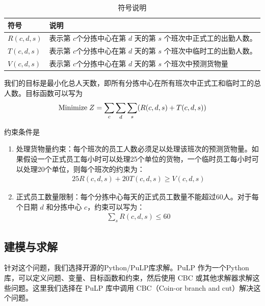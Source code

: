 \documentclass[UTF8]{article}%
\begin{document}
\begin{table}[!ht]
\renewcommand\arraystretch{1.2}
\caption{符号说明}%
\centering%
\begin{tabular}{p{3cm}<{\centering}p{11cm}<{\centering}}%
\toprule%
符号&说明 \\
\midrule%
$R(c,d,s)$&表示第 \(c\)个分拣中心在第 
$d$ 天的第 
$s$ 个班次中正式工的出勤人数。\\
$T(c,d,s)$&表示第 \(c\)个分拣中心在第 
$d$ 天的第 
$s$ 个班次中临时工的出勤人数。\\
$V(c,d,s)$& 表示第 \(c\)个分拣中心在第 
$d$ 天的第 
$s$ 个班次中预测货物量\\
\bottomrule%
\end{tabular}
\end{table}
我们的目标是最小化总人天数，即所有分拣中心在所有班次中正式工和临时工的总人数。目标函数可以写为
\begin{align*}
    {\rm Minimize\;}Z = \sum_{c}\sum_{d}\sum_{s}(R(c,d,s)+T(c,d,s))
\end{align*}

约束条件是
\begin{enumerate}
    \item 处理货物量约束：每个班次的员工人数必须足以处理该班次的预测货物量。如果假设一个正式员工每小时可以处理25个单位的货物，一个临时员工每小时可以处理20个单位，则每个班次的约束为：\begin{align*}
        25R(c,d,s)+20 T(c,d,s)\geq V(c,d,s)
    \end{align*}
    \item 正式员工数量限制：每个分拣中心每天的正式员工数量不能超过60人。对于每个日期 
    $d$ 和分拣中心 
    $c$，约束可以写为：\begin{align*}
        \sum_s R(c,d,s)\leq 60
    \end{align*}
\end{enumerate}

\subsection{建模与求解}
针对这个问题，我们选择开源的Python/PuLP库求解。PuLP 作为一个Python库，可以定义问题、变量、目标函数和约束，然后使用 CBC 或其他求解器求解这些问题。这里我们选择在 PuLP 库中调用 CBC（Coin-or branch and cut）解决这个问题。
\end{document}
